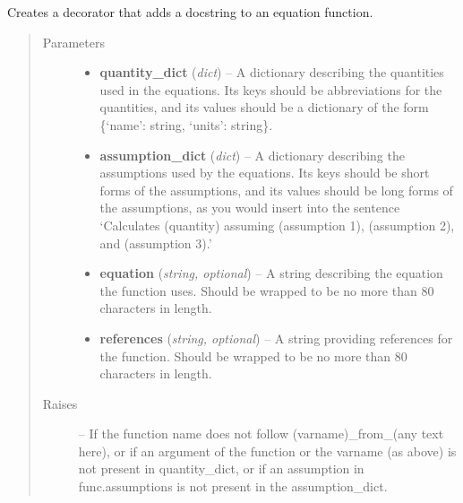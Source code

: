 \documentclass[letterpaper,10pt,english]{sphinxmanual}
\begin{document}

\begin{fulllineitems}
\label{atmos:atmos.decorators.equation_docstring}
Creates a decorator that adds a docstring to an equation function.
\begin{quote}\begin{description}
\item[{Parameters}] \leavevmode\begin{itemize}
\item {} 
\textbf{quantity\_dict} (\emph{dict}) -- A dictionary describing the quantities used in the equations. Its keys
should be abbreviations for the quantities, and its values should be a
dictionary of the form \{`name': string, `units': string\}.

\item {} 
\textbf{assumption\_dict} (\emph{dict}) -- A dictionary describing the assumptions used by the equations. Its keys
should be short forms of the assumptions, and its values should be long
forms of the assumptions, as you would insert into the sentence
`Calculates (quantity) assuming (assumption 1), (assumption 2), and
(assumption 3).'

\item {} 
\textbf{equation} (\emph{string, optional}) -- A string describing the equation the function uses. Should be wrapped
to be no more than 80 characters in length.

\item {} 
\textbf{references} (\emph{string, optional}) -- A string providing references for the function. Should be wrapped to be
no more than 80 characters in length.

\end{itemize}

\item[{Raises}] \leavevmode
{} --
If the function name does not follow (varname)\_from\_(any text here), or
if an argument of the function or the varname (as above) is not present
in quantity\_dict, or if an assumption in func.assumptions is not present
in the assumption\_dict.

\end{description}\end{quote}

\end{fulllineitems}
\end{document}
